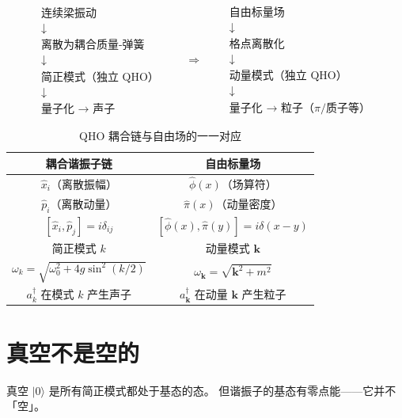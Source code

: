 \documentclass[12pt,a4paper]{article}
\begin{document}
\begin{equation}
\begin{array}{c}
\text{连续梁振动} \\
\downarrow \\
\text{离散为耦合质量-弹簧} \\
\downarrow \\
\text{简正模式（独立 QHO）} \\
\downarrow \\
\text{量子化 → 声子}
\end{array}
\qquad\Longrightarrow\qquad
\begin{array}{c}
\text{自由标量场} \\
\downarrow \\
\text{格点离散化} \\
\downarrow \\
\text{动量模式（独立 QHO）} \\
\downarrow \\
\text{量子化 → 粒子（$\pi$/质子等）}
\end{array}
\label{eq:analogy-box}
\end{equation}

\begin{table}[htbp]
\centering
\caption{QHO 耦合链与自由场的一一对应}
\begin{tabular}{c|c}
\hline
耦合谐振子链 & 自由标量场 \\
\hline
$\hat x_i$（离散振幅） & $\hat\phi(x)$（场算符） \\
$\hat p_i$（离散动量） & $\hat\pi(x)$（动量密度） \\
$[\hat x_i, \hat p_j] = i\delta_{ij}$ & $[\hat\phi(x), \hat\pi(y)] = i\delta(x-y)$ \\
简正模式 $k$ & 动量模式 $\mathbf{k}$ \\
$\omega_k = \sqrt{\omega_0^2 + 4g\sin^2(k/2)}$ & $\omega_{\mathbf{k}} = \sqrt{\mathbf{k}^2 + m^2}$ \\
$a_k^\dagger$ 在模式 $k$ 产生声子 & $a_{\mathbf{k}}^\dagger$ 在动量 $\mathbf{k}$ 产生粒子 \\
\hline
\end{tabular}
\label{tab:analogy}
\end{table}

\section{真空不是空的}

真空 $|0\rangle$ 是所有简正模式都处于基态的态。
但谐振子的基态有零点能——它并不「空」。
\end{document}
